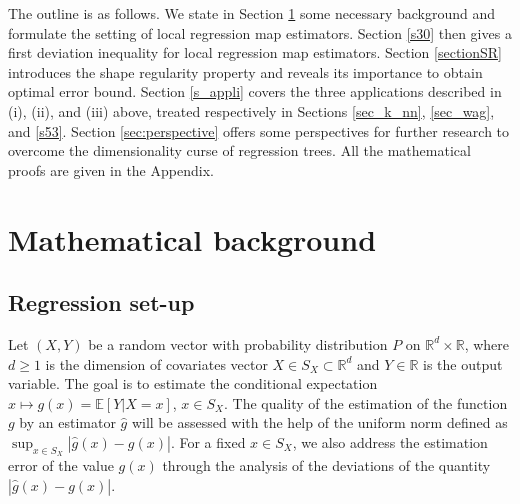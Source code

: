 \documentclass[paper=a4, fontsize=11pt]{scrartcl}
\begin{document}

The outline is as follows. We state in Section \ref{s2} some necessary background and formulate the setting of local regression map estimators. 
 Section \ref{s30} then gives a first deviation inequality for local regression map estimators. Section \ref{sectionSR} introduces the shape regularity property and reveals its importance to obtain optimal error bound. Section \ref{s_appli} covers the three applications described in (i), (ii), and (iii) above, treated respectively in Sections  \ref{sec_k_nn}, \ref{sec_wag}, and \ref{s53}.
Section \ref{sec:perspective} offers some perspectives for further research to overcome the dimensionality curse of regression trees. All the mathematical proofs are given in the Appendix.


\section{Mathematical background}\label{s2}

\subsection{Regression set-up}\label{s21}

Let $(X,Y)$ be a random vector with probability distribution $ P$ on $\mathbb R^d \times \mathbb R$, where $d\geq 1$ is the dimension of covariates vector $X\in S_X \subset\mathbb R^d$ and $Y \in \mathbb R$ is the output variable.  The goal is to estimate the conditional expectation $x\mapsto g(x) = \mathbb E [ Y|X= x]$, $x\in S_X$. The quality of the estimation of the function $g$ by an estimator $\hat g$ will be assessed with the help of the uniform norm defined as $\sup_{x\in S_X} | \hat g(x) - g(x) | $. %
For a fixed $x\in S_X$, we also address the estimation error of the value $g(x)$ through the analysis of the deviations of the quantity $| \hat g(x) - g(x) | $. 
\end{document}
